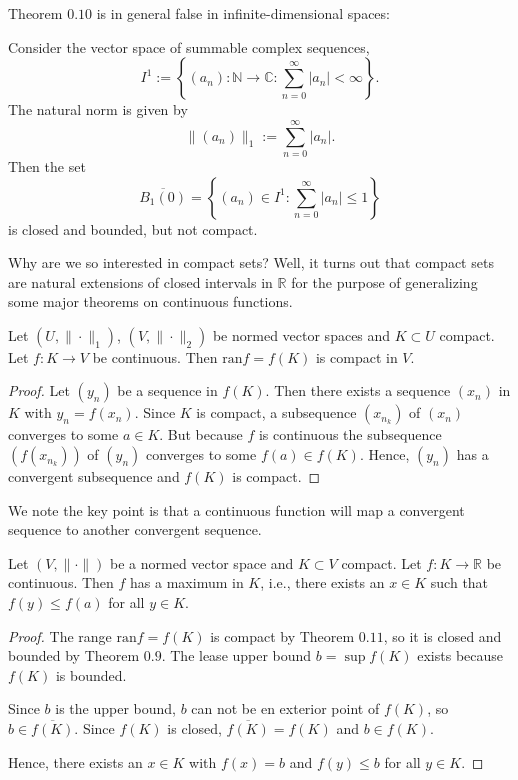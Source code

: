\documentclass[10pt]{article}
\let\emph\relax %
\newcommand{\C}{\mathbb{C}}
\newcommand{\R}{\mathbb{R}}
\newcommand{\N}{\mathbb{N}}
\begin{document}
  Theorem $0.10$ is in general false in infinite-dimensional spaces:
  \begin{example}
    Consider the vector space of summable complex sequences,
    \[
      I^{1}:=\left\{(a_{n}): \N \rightarrow \C:\sum_{n = 0}^{\infty} |a_{n}|< \infty \right\}.  
    \]
    The natural norm is given by
    \[
      \|(a_{n})\|_{1} := \sum_{n = 0}^{\infty}|a_{n}|.  
    \]
    Then the set 
    \[
      \overline{B_{1}(0)} = \left\{(a_{n}) \in I^{1}:\sum_{n = 0}^{\infty}|a_{n}| \leq 1\right\}  
    \]
    is closed and bounded, but not compact.
  \end{example}

  Why are we so interested in compact sets? Well, it turns out that compact sets are natural extensions of closed intervals in $\R$
  for the purpose of generalizing some major theorems on continuous functions.
  \begin{theorem}
    Let $(U,\|\cdot\|_{1})$, $(V,\|\cdot\|_{2})$ be normed vector spaces and $K \subset U$ compact.
    Let $f: K \rightarrow V$ be continuous. Then $\text{ran}f = f(K)$ is compact in $V$.
  \end{theorem}

  \begin{proof}
    Let $(y_{n})$ be a sequence in $f(K)$. Then there exists a sequence $(x_{n})$ in $K$ with $y_{n} = f(x_{n})$.
    Since $K$ is compact, a subsequence $(x_{n_{k}})$ of $(x_{n})$ converges to some $a \in K$.
    But because $f$ is continuous the subsequence $(f(x_{n_{k}}))$ of $(y_{n})$ converges to some $f(a) \in f(K)$.
    Hence, $(y_{n})$ has a convergent subsequence and $f(K)$ is compact.
  \end{proof}

  \begin{remark}
    We note the key point is that a continuous function will map a convergent sequence to another convergent sequence.
  \end{remark}

  \begin{theorem}
    Let $(V,\|\cdot\|)$ be a normed vector space and $K \subset V$ compact. Let $f: K \rightarrow \R$ be continuous.
    Then $f$ has a maximum in $K$, i.e., there exists an $x \in K$ such that $f(y) \leq f(a)$ for all $y \in K$.
  \end{theorem}

  \begin{proof}
    The range $\text{ran}f = f(K)$ is compact by Theorem $0.11$, so it is closed and bounded by Theorem $0.9$.
    The lease upper bound $b = \sup f(K)$ exists because $f(K)$ is bounded.

    Since $b$ is the \emph{least} upper bound, $b$ can not be en exterior point of $f(K)$, so $b \in \overline{f(K)}$.
    Since $f(K)$ is closed, $\overline{f(K)} = f(K)$ and $b \in f(K)$.

    Hence, there exists an $x \in K$ with $f(x) = b$ and $f(y) \leq b$ for all $y \in K$.
  \end{proof}
  
\end{document}
